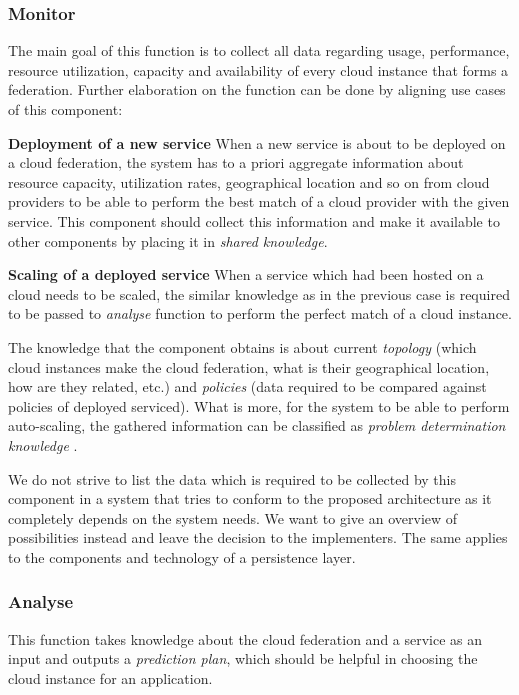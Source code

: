 \subsubsection{Monitor}
The main goal of this function is to collect all data regarding usage, performance, resource utilization, capacity and availability of every cloud instance that forms a federation. Further elaboration on the function can be done by aligning use cases of this component:
\begin{asparaenum}
\item[\textbf{Deployment of a new service}] When a new service is about to be deployed on a cloud federation, the system has to a priori aggregate information about resource capacity, utilization rates, geographical location and so on from cloud providers to be able to perform the best match of a cloud provider with the given service. This component should collect this information and make it available to other components by placing it in \emph{shared knowledge}.
  \item[\textbf{Scaling of a deployed service}] When a service which had been hosted on a cloud needs to be scaled, the similar knowledge as in the previous case is required to be passed to \emph{analyse} function to perform the perfect match of a cloud instance.
\end{asparaenum}

The knowledge that the component obtains is about current \emph{topology} (which cloud instances make the cloud federation, what is their geographical location, how are they related, etc.) and \emph{policies} (data required to be compared against policies of deployed serviced). What is more, for the system to be able to perform auto-scaling, the gathered information can be classified as \emph{problem determination knowledge} \cite{IBM06}.

We do not strive to list the data which is required to be collected by this component in a system that tries to conform to the proposed architecture as it completely depends on the system needs. We want to give an overview of possibilities instead and leave the decision to the implementers. The same applies to the components and technology of a persistence layer.

\subsubsection{Analyse}
This function takes knowledge about the cloud federation and a service as an input and outputs a \emph{prediction plan}, which should be helpful in choosing the cloud instance for an application.

